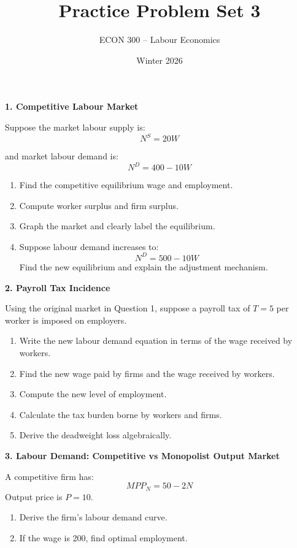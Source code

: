 \documentclass[12pt]{article}
\title{Practice Problem Set 3}
\author{ECON 300 -- Labour Economics}
\date{Winter 2026}
\begin{document}
\maketitle


\textbf{1. Competitive Labour Market}

Suppose the market labour supply is:
\[
N^S = 20W
\]

and market labour demand is:
\[
N^D = 400 - 10W
\]

\begin{enumerate}
\item[(a)] Find the competitive equilibrium wage and employment.
\item[(b)] Compute worker surplus and firm surplus.
\item[(c)] Graph the market and clearly label the equilibrium.
\item[(d)] Suppose labour demand increases to:
\[
N^D = 500 - 10W
\]
Find the new equilibrium and explain the adjustment mechanism.
\end{enumerate}


\vspace{1em}

\textbf{2. Payroll Tax Incidence}

Using the original market in Question 1, suppose a payroll tax of $T = 5$ per worker is imposed on employers.

\begin{enumerate}
\item[(a)] Write the new labour demand equation in terms of the wage received by workers.
\item[(b)] Find the new wage paid by firms and the wage received by workers.
\item[(c)] Compute the new level of employment.
\item[(d)] Calculate the tax burden borne by workers and firms.
\item[(e)] Derive the deadweight loss algebraically.
\end{enumerate}


\vspace{1em}

\textbf{3. Labour Demand: Competitive vs Monopolist Output Market}

A competitive firm has:
\[
MPP_N = 50 - 2N
\]
Output price is $P = 10$.

\begin{enumerate}
\item[(a)] Derive the firm’s labour demand curve.
\item[(b)] If the wage is 200, find optimal employment.
\end{enumerate}
\end{document}

